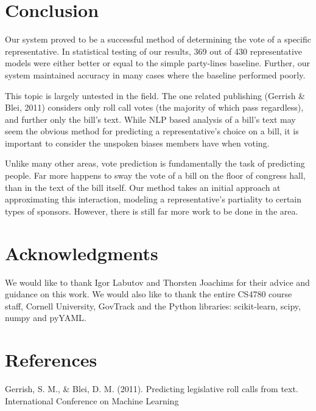\documentclass[11pt,letterpaper,twocolumn]{article}
\begin{document}
\section{Conclusion}
Our system proved to be a successful method of determining the vote of a specific representative. In statistical testing of our results, 369 out of 430 representative models were either better or equal to the simple party-lines baseline. Further, our system maintained accuracy in many cases where the baseline performed poorly.

This topic is largely untested in the field. The one related publishing (Gerrish \& Blei, 2011) considers only roll call votes (the majority of which pass regardless), and further only the bill's text. While NLP based analysis of a bill's text may seem the obvious method for predicting a representative's choice on a bill, it is important to consider the unspoken biases members have when voting. 

Unlike many other areas, vote prediction is fundamentally the task of predicting people. Far more happens to sway the vote of a bill on the floor of congress hall, than in the text of the bill itself. Our method takes an initial approach at approximating this interaction, modeling a representative's partiality to certain types of sponsors. However, there is still far more work to be done in the area.


\section*{Acknowledgments}

We would like to thank Igor Labutov and Thorsten Joachims for their advice and guidance on this work. We would also like to thank the entire CS4780 course staff, Cornell University, GovTrack and the Python libraries: scikit-learn, scipy, numpy and pyYAML.

\newpage

\section*{References}

Gerrish, S. M., \& Blei, D. M. (2011). Predicting legislative roll calls from text. International Conference on Machine Learning
\end{document}
